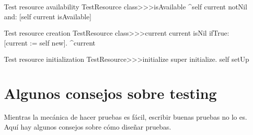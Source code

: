 \documentclass[a4paper,10pt,twoside]{book}
\begin{document}

\begin{method}[testresourceisavailable]{Test resource availability}
TestResource class>>>isAvailable
	^self current notNil and: [self current isAvailable]
\end{method}
\begin{method}[testresourcecurrent]{Test resource creation}
TestResource class>>>current
	current isNil ifTrue: [current := self new].
	^current
\end{method}
\begin{method}[restresourceinitialize]{Test resource initialization}
TestResource>>>initialize
	super initialize.
	self setUp
\end{method}
\section{Algunos consejos sobre testing}

Mientras la mec\'anica de hacer pruebas es f\'acil, escribir buenas pruebas no lo es.
Aqu\'i hay algunos consejos sobre c\'omo dise\~nar pruebas.
\end{document}
